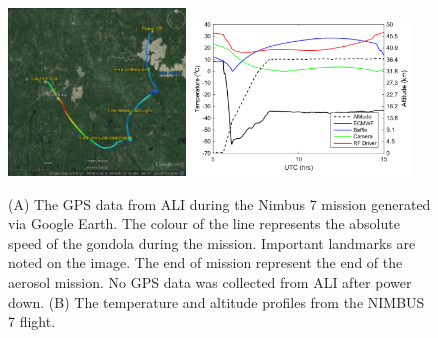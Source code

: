\documentclass[12pt]{article}
\begin{document}
\begin{figure}
    \begin{subfigure}[t]{0\textwidth}
        \label{fig:5.1:nimbus7FlightPath:a}
    \end{subfigure}
    \begin{subfigure}[t]{0\textwidth}
         \label{fig:5.1:nimbus7FlightPath:b}
    \end{subfigure}
    \includegraphics[width=0.42\textwidth]{./Images/5-1-AliGpsDataGoogleMaps.jpg}
    \includegraphics[width=0.52\textwidth]{./Images/5-1-FlightTemperatures.pdf}
    \caption{(A) The GPS data from ALI during the Nimbus 7 mission generated via Google Earth. The colour of the line represents the absolute speed of the gondola during the 
mission. Important landmarks are noted on the image. The end of mission represent the end of the aerosol mission. No GPS data was collected from ALI after power down. (B) 
The temperature and altitude profiles from the NIMBUS 7 flight.}
    \label{fig:5.1:nimbus7FlightPath}
\end{figure}

\clearpage
\end{document}

